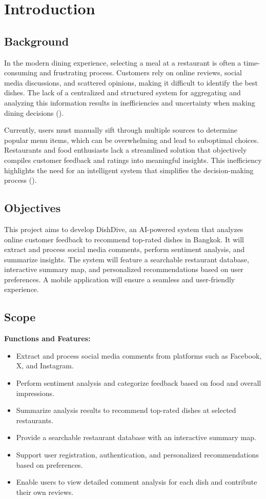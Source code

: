 \chapter{Introduction}

\section{Background}
In the modern dining experience, selecting a meal at a restaurant is often a time-consuming and frustrating process. Customers rely on online reviews, social media discussions, and scattered opinions, making it difficult to identify the best dishes. The lack of a centralized and structured system for aggregating and analyzing this information results in inefficiencies and uncertainty when making dining decisions (\parencite{HintIt2025}).

Currently, users must manually sift through multiple sources to determine popular menu items, which can be overwhelming and lead to suboptimal choices. Restaurants and food enthusiasts lack a streamlined solution that objectively compiles customer feedback and ratings into meaningful insights. This inefficiency highlights the need for an intelligent system that simplifies the decision-making process (\parencite{Graham2017}).

\section{Objectives}
This project aims to develop DishDive, an AI-powered system that analyzes online customer feedback to recommend top-rated dishes in Bangkok. It will extract and process social media comments, perform sentiment analysis, and summarize insights. The system will feature a searchable restaurant database, interactive summary map, and personalized recommendations based on user preferences. A mobile application will ensure a seamless and user-friendly experience.

\section{Scope}
\textbf{Functions and Features:}
\begin{itemize}
\item Extract and process social media comments from platforms such as Facebook, X, and Instagram.
\item Perform sentiment analysis and categorize feedback based on food and overall impressions.
\item Summarize analysis results to recommend top-rated dishes at selected restaurants.
\item Provide a searchable restaurant database with an interactive summary map.
\item Support user registration, authentication, and personalized recommendations based on preferences.
\item Enable users to view detailed comment analysis for each dish and contribute their own reviews.
\end{itemize}


